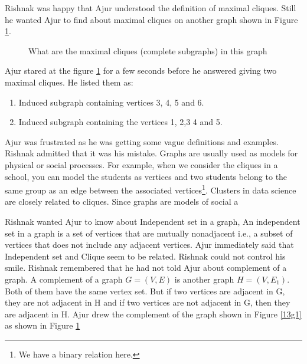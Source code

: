 Rishnak was happy that Ajur understood the definition of maximal cliques. Still he wanted Ajur to find about maximal cliques on another graph shown in Figure \ref{13g21}.
\begin{figure}
\begin{center}
\caption{ What are the maximal cliques (complete subgraphs) in this graph}\label{13g21}
\end{center}
\end{figure}

Ajur stared at the figure \ref{13g21} for a few seconds before he answered giving two maximal cliques. He listed them as: 
\begin{enumerate}
    \item Induced subgraph containing vertices 3, 4, 5 and 6.
    \item Induced subgraph containing the vertices 1, 2,3 4 and 5.
\end{enumerate} 
Ajur was frustrated as he was getting some vague definitions and examples. Rishnak admitted that it was his mistake. Graphs are usually used as models for physical or social processes. For example, when we consider the cliques in a school, you can model the students as vertices and two students belong to the same group as an edge between the associated vertices\footnote{We have a binary relation here.}. Clusters in data science are closely related to cliques. Since graphs are models of social a

Rishnak wanted Ajur to know about Independent set in a graph, An independent set in a graph is a set of vertices that are mutually nonadjacent i.e., a subset of vertices that does not include any adjacent vertices. Ajur immediately said that Independent set and Clique seem to be related. Rishnak could not control his smile. Rishnak remembered that he had not told Ajur about complement of a graph. A complement of a graph $G=(V,E)$ is another graph $H=(V,E_1)$. Both of them have the same vertex set. But if two vertices are adjacent in G, they are not adjacent in H and if two vertices are not adjacent in G, then they are adjacent in H. Ajur drew the complement of the graph shown in Figure \ref{13g1} as shown in Figure \ref{13g21}

